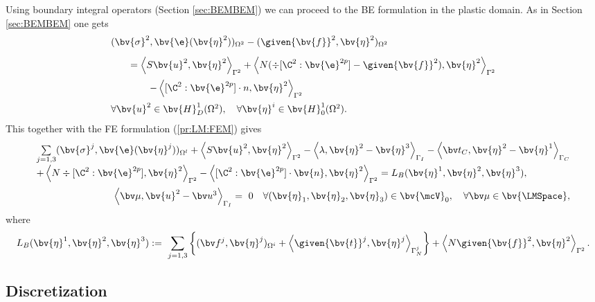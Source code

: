 Using boundary integral operators (Section \ref{sec:BEMBEM})  we can proceed to the BE formulation in the plastic domain. As in Section \ref{sec:BEMBEM} one gets
\begin{equation*}
\begin{array}{l}
(\bv{\sigma}^2,\bv{\e}(\bv{\eta}^2))_{\Omega^2} 
- (\given{\bv{f}}^{2}, \bv{\eta}^2)_{\Omega^2}\\[2ex]
\qquad = \left\langle S \bv{u}^2, \bv{\eta}^2 \right\rangle_{\Gamma^2} 
+ \left\langle N (\div [\C^{2} : \bv{\e}^{2p}] - \given{\bv{f}}^{2}) , \bv{\eta}^2 \right\rangle_{\Gamma^2} \\[2ex]
\qquad \qquad 
- \left\langle [\C^{2} : \bv{\e}^{2p}] \cdot n, \bv{\eta}^2\right\rangle_{\Gamma^2} \\[2ex]
\forall \bv{u}^2 \in \bv{H}^1_D(\Omega^2), \quad \forall \bv{\eta}^i \in \bv{H}^1_0(\Omega^2).
\end{array}
\end{equation*}
This together with the FE formulation (\ref{pr:LM:FEM}) gives
\begin{equation}\label{pr:LM:FEMBEM}
\begin{array}{l}
\sum \limits_{j=1,3} 
   (\bv{\sigma}^j,\bv{\e}(\bv{\eta}^j))_{\Omega^l}
+ \left\langle S \bv{u}^2, \bv{\eta}^2 \right\rangle_{\Gamma^2}
 - \left\langle \lambda, \bv{\eta}^2 - \bv{\eta}^3 \right\rangle_{\Gamma_I} 
 - \left\langle \bv t_C, \bv{\eta}^2 - \bv{\eta}^1 \right\rangle_{\Gamma_C}  \\[2ex]
+ \left\langle N \div [\C^{2} : \bv{\e}^{2p}] , \bv{\eta}^2 \right\rangle_{\Gamma^2}
- \left\langle [\C^{2} : \bv{\e}^{2p}] \cdot \bv{n}, \bv{\eta}^2\right\rangle_{\Gamma^2}
= L_B(\bv{\eta}^1, \bv{\eta}^2, \bv{\eta}^3),  \\[2ex]
\qquad \qquad \qquad \qquad  \left\langle \bv \mu, \bv{u}^2 - \bv u^3 \right\rangle_{\Gamma_I} 
 =\,\, 0   \quad 
 \forall (\bv{\eta}_1,\bv{\eta}_2,\bv{\eta}_3) \in \bv{\mcV}_0, \quad \forall \bv \mu \in \bv{\LMSpace},
\end{array}
\end{equation}
where
\[
L_B(\bv{\eta}^1, \bv{\eta}^2, \bv{\eta}^3):=\,\, \sum_{j=1,3} \left\lbrace 
 (\bv f^j, \bv{\eta}^j)_{\Omega^i} 
+ \left\langle \given{\bv{t}}^j, \bv{\eta}^j \right\rangle_{\Gamma_N^j} \right\rbrace 
+ \left\langle N \given{\bv{f}}^{2} , \bv{\eta}^2 \right\rangle_{\Gamma^2}.
\]

\subsection{Discretization}

